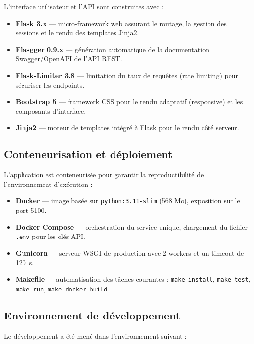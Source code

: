 L'interface utilisateur et l'API sont construites avec :

\begin{itemize}
    \item \textbf{Flask 3.x} — micro-framework web assurant le routage, la gestion des sessions et le rendu des templates Jinja2.
    \item \textbf{Flasgger 0.9.x} — génération automatique de la documentation Swagger/OpenAPI de l'API REST.
    \item \textbf{Flask-Limiter 3.8} — limitation du taux de requêtes (rate limiting) pour sécuriser les endpoints.
    \item \textbf{Bootstrap 5} — framework CSS pour le rendu adaptatif (responsive) et les composants d'interface.
    \item \textbf{Jinja2} — moteur de templates intégré à Flask pour le rendu côté serveur.
\end{itemize}

\subsection{Conteneurisation et déploiement}

L'application est conteneurisée pour garantir la reproductibilité de l'environnement d'exécution :

\begin{itemize}
    \item \textbf{Docker} — image basée sur \texttt{python:3.11-slim} (568 Mo), exposition sur le port 5100.
    \item \textbf{Docker Compose} — orchestration du service unique, chargement du fichier \texttt{.env} pour les clés API.
    \item \textbf{Gunicorn} — serveur WSGI de production avec 2 workers et un timeout de 120~s.
    \item \textbf{Makefile} — automatisation des tâches courantes : \texttt{make install}, \texttt{make test}, \texttt{make run}, \texttt{make docker-build}.
\end{itemize}

\subsection{Environnement de développement}

Le développement a été mené dans l'environnement suivant :


